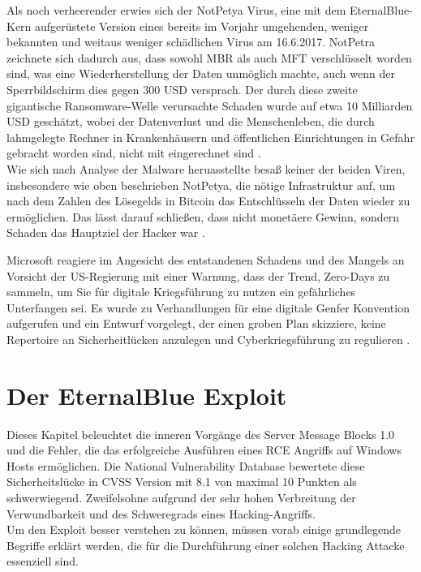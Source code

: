 \documentclass[DIV=12,headings=normal,pdftex,headinclude=false,footinclude=false,final]{scrreprt}
\begin{document}
\noindent
Als noch verheerender erwies sich der NotPetya Virus, eine mit dem EternalBlue-Kern aufgerüstete Version eines bereits im Vorjahr umgehenden, weniger bekannten und weitaus weniger schädlichen Virus am 16.6.2017. NotPetra zeichnete sich dadurch aus, dass sowohl MBR als auch MFT verschlüsselt worden sind, was eine Wiederherstellung der Daten unmöglich machte, auch wenn der Sperrbildschirm dies gegen 300 USD versprach. Der durch diese zweite gigantische Ransomware-Welle verursachte Schaden wurde auf etwa 10 Milliarden USD geschätzt, wobei der Datenverlust und die Menschenleben, die durch lahmgelegte Rechner in Krankenhäusern und öffentlichen Einrichtungen in Gefahr gebracht worden sind, nicht mit eingerechnet sind \cite{Avast}.\\
Wie sich nach Analyse der Malware heruasstellte besaß keiner der beiden Viren, insbesondere wie oben beschrieben NotPetya, die nötige Infrastruktur auf, um nach dem Zahlen des Lösegelds in Bitcoin das Entschlüsseln der Daten wieder zu ermöglichen. Das lässt darauf schließen, dass nicht monetäere Gewinn, sondern Schaden das Hauptziel der Hacker war \cite{Sil}.

\noindent
Microsoft reagiere im Angesicht des entstandenen Schadens und des Mangels an Vorsicht der US-Regierung mit einer Warnung, dass der Trend, Zero-Days zu sammeln, um Sie für digitale Kriegsführung zu nutzen ein gefährliches Unterfangen sei. Es wurde zu Verhandlungen für eine digitale Genfer Konvention aufgerufen und ein Entwurf vorgelegt, der einen groben Plan skizziere, keine Repertoire an Sicherheitlücken anzulegen und Cyberkriegsführung zu regulieren \cite{MS:EB}.

\chapter{Der EternalBlue Exploit}
Dieses Kapitel beleuchtet die inneren Vorgänge des Server Message Blocks 1.0 und die Fehler, die das erfolgreiche Ausführen eines RCE Angriffs auf Windows Hosts ermöglichen. Die National Vulnerability Database bewertete diese Sicherheitslücke in CVSS Version mit 8.1 von maximal 10 Punkten \cite{NVD} als schwerwiegend. Zweifelsohne aufgrund der sehr hohen Verbreitung der Verwundbarkeit und des Schweregrads eines Hacking-Angriffs. \\
Um den Exploit besser verstehen zu können, müssen vorab einige grundlegende Begriffe erklärt werden, die für die Durchführung einer solchen Hacking Attacke essenziell sind.
\end{document}
